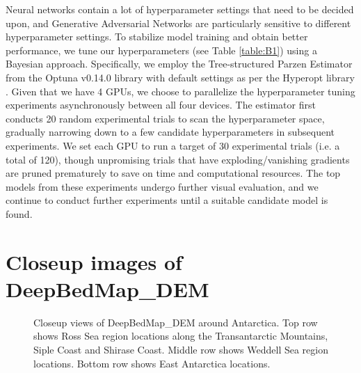 \documentclass[tc, manuscript]{copernicus}
\begin{document}
Neural networks contain a lot of hyperparameter settings that need to be decided upon, and Generative Adversarial Networks are particularly sensitive to different hyperparameter settings.
To stabilize model training and obtain better performance, we tune our hyperparameters (see Table \ref{table:B1}) using a Bayesian approach.
Specifically, we employ the Tree-structured Parzen Estimator \citep{BergstraAlgorithmsHyperparameterOptimization2011} from the Optuna v0.14.0 \citep{AkibaOptunaNextgenerationHyperparameter2019} library with default settings as per the Hyperopt library \citep{BergstraHyperoptPythonlibrary2015}.
Given that we have 4 GPUs, we choose to parallelize the hyperparameter tuning experiments asynchronously between all four devices.
The estimator first conducts 20 random experimental trials to scan the hyperparameter space, gradually narrowing down to a few candidate hyperparameters in subsequent experiments.
We set each GPU to run a target of 30 experimental trials (i.e. a total of 120), though unpromising trials that have exploding/vanishing gradients are pruned prematurely to save on time and computational resources.
The top models from these experiments undergo further visual evaluation, and we continue to conduct further experiments until a suitable candidate model is found.


\section{Closeup images of DeepBedMap\_DEM} \label{appendix:C}

\begin{figure*}[htbp]
  \centering
  \qquad
  \qquad
  \caption{
    Closeup views of DeepBedMap\_DEM around Antarctica.
    Top row shows Ross Sea region locations along the Transantarctic Mountains, Siple Coast and Shirase Coast.
    Middle row shows Weddell Sea region locations.
    Bottom row shows East Antarctica locations.
  }
  \label{fig:C}
\end{figure*}
\end{document}
